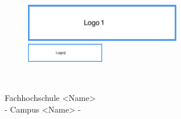 \thispagestyle{empty}


\begin{figure}[t]
 \centering
 \includegraphics[width=0.6\textwidth]{abb/logo1}
~~~~~~~~~~
 \includegraphics[width=0.3\textwidth]{abb/logo2}
\end{figure}


\begin{verbatim}


\end{verbatim}

\begin{center}
\Large{Fachhochschule <Name>}\\
\Large{- Campus <Name> -}\\
\end{center}


